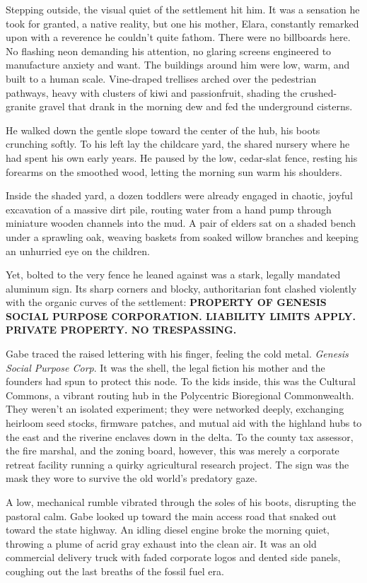 Stepping outside, the visual quiet of the settlement hit him. It was a sensation he took for granted, a native reality, but one his mother, Elara, constantly remarked upon with a reverence he couldn't quite fathom. There were no billboards here. No flashing neon demanding his attention, no glaring screens engineered to manufacture anxiety and want. The buildings around him were low, warm, and built to a human scale. Vine-draped trellises arched over the pedestrian pathways, heavy with clusters of kiwi and passionfruit, shading the crushed-granite gravel that drank in the morning dew and fed the underground cisterns. 

He walked down the gentle slope toward the center of the hub, his boots crunching softly. To his left lay the childcare yard, the shared nursery where he had spent his own early years. He paused by the low, cedar-slat fence, resting his forearms on the smoothed wood, letting the morning sun warm his shoulders. 

Inside the shaded yard, a dozen toddlers were already engaged in chaotic, joyful excavation of a massive dirt pile, routing water from a hand pump through miniature wooden channels into the mud. A pair of elders sat on a shaded bench under a sprawling oak, weaving baskets from soaked willow branches and keeping an unhurried eye on the children.

Yet, bolted to the very fence he leaned against was a stark, legally mandated aluminum sign. Its sharp corners and blocky, authoritarian font clashed violently with the organic curves of the settlement: \textbf{PROPERTY OF GENESIS SOCIAL PURPOSE CORPORATION. LIABILITY LIMITS APPLY. PRIVATE PROPERTY. NO TRESPASSING.}

Gabe traced the raised lettering with his finger, feeling the cold metal. \textit{Genesis Social Purpose Corp}. It was the shell, the legal fiction his mother and the founders had spun to protect this node. To the kids inside, this was the Cultural Commons, a vibrant routing hub in the Polycentric Bioregional Commonwealth. They weren't an isolated experiment; they were networked deeply, exchanging heirloom seed stocks, firmware patches, and mutual aid with the highland hubs to the east and the riverine enclaves down in the delta. To the county tax assessor, the fire marshal, and the zoning board, however, this was merely a corporate retreat facility running a quirky agricultural research project. The sign was the mask they wore to survive the old world's predatory gaze.

A low, mechanical rumble vibrated through the soles of his boots, disrupting the pastoral calm. Gabe looked up toward the main access road that snaked out toward the state highway. An idling diesel engine broke the morning quiet, throwing a plume of acrid gray exhaust into the clean air. It was an old commercial delivery truck with faded corporate logos and dented side panels, coughing out the last breaths of the fossil fuel era. 

